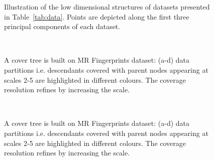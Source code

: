 \else
\begin{figure}[t!]
	\centering
	\begin{minipage}{\linewidth}
		\centering
		\quad	
		\quad	
		\quad	
		\caption{Illustration of the low dimensional structures of  datasets presented in Table~\ref{tab:data}. Points are depicted along the first three principal components of each dataset.\label{fig:datasets}}
	\end{minipage}
\end{figure}
\fi
		
		
\ifCLASSOPTIONtwocolumn
\begin{figure}[t!]
\centering
\begin{minipage}{\linewidth}
		\quad	
		\\
		\quad
		\caption{A cover tree is built on MR Fingerprints dataset: (a-d) data partitions i.e. descendants covered with parent nodes appearing at scales 2-5
			are highlighted in different colours. The coverage resolution refines 
			by increasing the scale.\label{fig:CT}}
\end{minipage}
\end{figure}
\else
\begin{figure}[t!]
	\centering
	\begin{minipage}{\linewidth}
		\centering
		\quad	
		\\
		\quad
		\caption{A cover tree is built on MR Fingerprints dataset: (a-d) data partitions i.e. descendants covered with parent nodes appearing at scales 2-5
			are highlighted in different colours. The coverage resolution refines 
			by increasing the scale.\label{fig:CT}}
	\end{minipage}
\end{figure}
\fi

